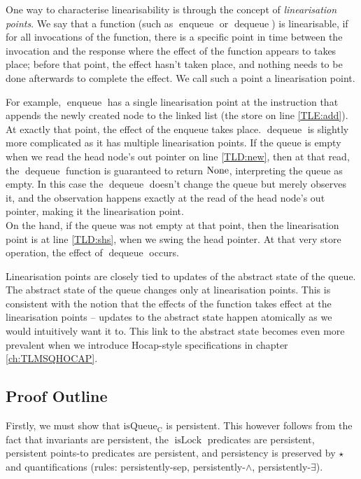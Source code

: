 \documentclass[a4paper, 10pt]{report}
\theoremstyle{definition}
\newcommand{\isLock}{\operatorname{isLock}}
\newcommand{\enqueue}{\operatorname{enqueue}}
\newcommand{\dequeue}{\operatorname{dequeue}}
\newcommand{\isqueueconc}{\operatorname{isQueue_{C}}}
\begin{document}
One way to characterise linearisability is through the concept of \textit{linearisation points}. We say that a function (such as $\enqueue$ or $\dequeue$) is linearisable, if for all invocations of the function, there is a specific point in time between the invocation and the response where the effect of the function appears to takes place; before that point, the effect hasn't taken place, and nothing needs to be done afterwards to complete the effect. We call such a point a linearisation point.

For example, $\enqueue$ has a single linearisation point at the instruction that appends the newly created node to the linked list (the store on line \ref{TLE:add}). At exactly that point, the effect of the enqueue takes place. $\dequeue$ is slightly more complicated as it has multiple linearisation points. If the queue is empty when we read the head node's out pointer on line \ref{TLD:new}, then at that read, the $\dequeue$ function is guaranteed to return $\operatorname{None}$, interpreting the queue as empty. In this case the $\dequeue$ doesn't change the queue but merely observes it, and the observation happens exactly at the read of the head node's out pointer, making it the linearisation point.\\
On the hand, if the queue was not empty at that point, then the linearisation point is at line \ref{TLD:shs}, when we swing the head pointer. At that very store operation, the effect of $\dequeue$ occurs.

Linearisation points are closely tied to updates of the abstract state of the queue. The abstract state of the queue changes only at linearisation points. This is consistent with the notion that the effects of the function takes effect at the linearisation points -- updates to the abstract state happen atomically as we would intuitively want it to. This link to the abstract state becomes even more prevalent when we introduce Hocap-style specifications in chapter \ref{ch:TLMSQHOCAP}.

\subsection{Proof Outline}
\label{TLMSQSPECS:concurrent:sub:proof-outline}
Firstly, we must show that $\isqueueconc$ is persistent. This however follows from the fact that invariants are persistent, the $\isLock$ predicates are persistent, persistent points-to predicates are persistent, and persistency is preserved by $\star{}$ and quantifications (rules: persistently-sep, persistently-$\land{}$, persistently-$\exists$).
\end{document}
